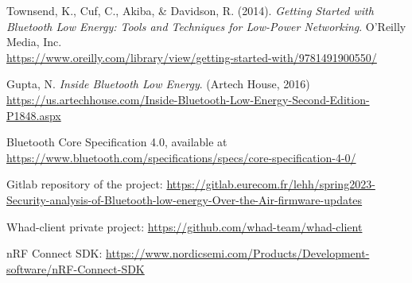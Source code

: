 \documentclass{article}
\theoremstyle{plain}
\theoremstyle{definition}
\numberwithin{equation}{section}
\begin{document}
\begin{thebibliography}{100}
	
	 Townsend, K., Cuf, C., Akiba, \& Davidson, R. (2014). {\it Getting Started with Bluetooth Low Energy: Tools and Techniques for Low-Power Networking}. O'Reilly Media, Inc.\\
	\url{https://www.oreilly.com/library/view/getting-started-with/9781491900550/}
	
	
	Gupta, N. {\it Inside Bluetooth Low Energy}. (Artech House, 2016)\\ \url{https://us.artechhouse.com/Inside-Bluetooth-Low-Energy-Second-Edition-P1848.aspx}
	
	
	
	 Bluetooth Core Specification 4.0, available at \url{https://www.bluetooth.com/specifications/specs/core-specification-4-0/}
	
	
	
	 Gitlab repository of the project:  \url{https://gitlab.eurecom.fr/lehh/spring2023-Security-analysis-of-Bluetooth-low-energy-Over-the-Air-firmware-updates}


	 Whad-client private project: \url{https://github.com/whad-team/whad-client}


	 nRF Connect SDK: \url{https://www.nordicsemi.com/Products/Development-software/nRF-Connect-SDK}
	
\end{thebibliography}
\end{document}
